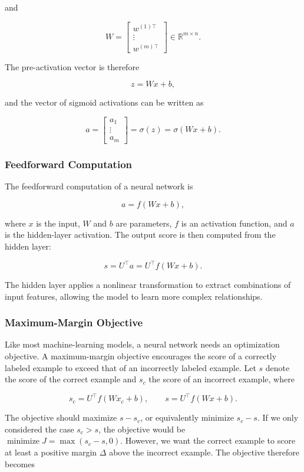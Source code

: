 \documentclass[
  a4paper,
  10pt]{article}
\begin{document}
and

\[
W=
\begin{bmatrix}
w^{(1)\top}\\
\vdots\\
w^{(m)\top}
\end{bmatrix}
\in\mathbb{R}^{m\times n}.
\]

The pre-activation vector is therefore

\[
z=Wx+b,
\]

and the vector of sigmoid activations can be written as

\[
a=
\begin{bmatrix}
a_1\\
\vdots\\
a_m
\end{bmatrix}
=\sigma(z)=\sigma(Wx+b).
\]

\subsubsection{Feedforward Computation}\label{feedforward-computation}

The feedforward computation of a neural network is

\[
a=f(Wx+b),
\]

where \(x\) is the input, \(W\) and \(b\) are parameters, \(f\) is an
activation function, and \(a\) is the hidden-layer activation. The
output score is then computed from the hidden layer:

\[
s=U^\top a=U^\top f(Wx+b).
\]

The hidden layer applies a nonlinear transformation to extract
combinations of input features, allowing the model to learn more complex
relationships.

\subsubsection{Maximum-Margin Objective}\label{maximum-margin-objective}

Like most machine-learning models, a neural network needs an
optimization objective. A maximum-margin objective encourages the score
of a correctly labeled example to exceed that of an incorrectly labeled
example. Let \(s\) denote the score of the correct example and \(s_c\)
the score of an incorrect example, where

\[
s_c=U^\top f(Wx_c+b),
\qquad
s=U^\top f(Wx+b).
\]

The objective should maximize \(s-s_c\), or equivalently minimize
\(s_c-s\). If we only considered the case \(s_c>s\), the objective would
be \(\operatorname{minimize} J=\max(s_c-s,0)\). However, we want the
correct example to score at least a positive margin \(\Delta\) above the
incorrect example. The objective therefore becomes
\end{document}
